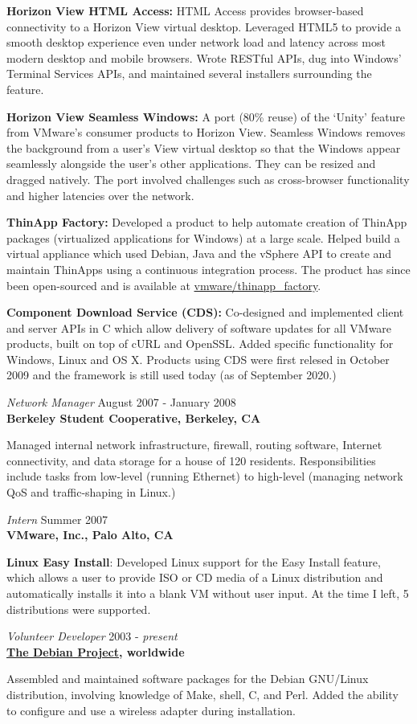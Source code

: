 \documentclass[overlapped,line,margin]{res}
\begin{document}
\begin{resume}
  \textbf{Horizon View HTML Access:} HTML Access provides browser-based
  connectivity to a Horizon View virtual desktop. Leveraged HTML5 to
  provide a smooth desktop experience even under network load and
  latency across most modern desktop and mobile browsers. Wrote RESTful
  APIs, dug into Windows' Terminal Services APIs, and maintained several
  installers surrounding the feature.

  \textbf{Horizon View Seamless Windows:} A port (80\% reuse) of the
  `Unity' feature from VMware's consumer products to Horizon View.
  Seamless Windows removes the background from a user's View virtual
  desktop so that the Windows appear seamlessly alongside the user's
  other applications. They can be resized and dragged natively. The
  port involved challenges such as cross-browser functionality and
  higher latencies over the network.

  \textbf{ThinApp Factory:} Developed a product to help automate
  creation of ThinApp packages (virtualized applications for Windows) at
  a large scale. Helped build a virtual appliance which used Debian,
  Java and the vSphere API to create and maintain ThinApps using a
  continuous integration process. The product has since been
  open-sourced and is available at
  \href{https://github.com/vmware/thinapp\_factory}{vmware/thinapp\_factory}.

  \textbf{Component Download Service (CDS):} Co-designed and implemented
  client and server APIs in C which allow delivery of software updates for
  all VMware products, built on top of cURL and OpenSSL. Added specific
  functionality for Windows, Linux and OS X. Products using CDS were
  first relesed in October 2009 and the framework is still used today
  (as of September 2020.)

\textit{Network Manager} \hfill August 2007 - January 2008 \\
\textbf{Berkeley Student Cooperative, Berkeley, CA}

  Managed internal network infrastructure, firewall, routing
  software, Internet connectivity, and data storage for a house of 120 residents.
  Responsibilities include tasks from low-level (running Ethernet)
  to high-level (managing network QoS and traffic-shaping in Linux.)

\textit{Intern} \hfill Summer 2007 \\
\textbf{VMware, Inc., Palo Alto, CA}

  \textbf{Linux Easy Install}: Developed Linux support for the Easy
  Install feature, which allows a user to provide ISO or CD media of
  a Linux distribution and automatically installs it into a blank VM
  without user input. At the time I left, 5 distributions were supported.

\textit{Volunteer Developer} \hfill 2003 - \textit{present} \\
\textbf{\href{https://www.debian.org}{The Debian Project}, worldwide}

  Assembled and maintained software packages for the Debian GNU/Linux
  distribution, involving knowledge of Make, shell, C, and Perl. Added
  the ability to configure and use a wireless adapter during installation.

\end{resume}
\end{document}
